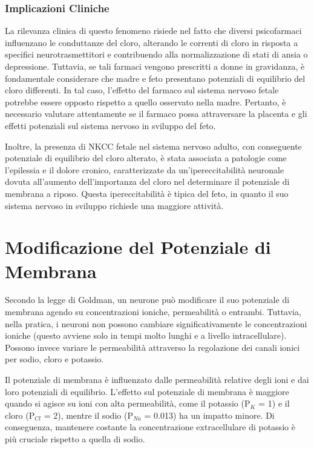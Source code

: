 \subsubsection{Implicazioni Cliniche}

La rilevanza clinica di questo fenomeno risiede nel fatto che diversi psicofarmaci influenzano le conduttanze del cloro, alterando le correnti di cloro in risposta a specifici neurotrasmettitori e contribuendo alla normalizzazione di stati di ansia o depressione. Tuttavia, se tali farmaci vengono prescritti a donne in gravidanza, è fondamentale considerare che madre e feto presentano potenziali di equilibrio del cloro differenti. In tal caso, l’effetto del farmaco sul sistema nervoso fetale potrebbe essere opposto rispetto a quello osservato nella madre. Pertanto, è necessario valutare attentamente se il farmaco possa attraversare la placenta e gli effetti potenziali sul sistema nervoso in sviluppo del feto.

Inoltre, la presenza di NKCC fetale nel sistema nervoso adulto, con conseguente potenziale di equilibrio del cloro alterato, è stata associata a patologie come l’epilessia e il dolore cronico, caratterizzate da un’ipereccitabilità neuronale dovuta all’aumento dell’importanza del cloro nel determinare il potenziale di membrana a riposo. Questa ipereccitabilità è tipica del feto, in quanto il suo sistema nervoso in sviluppo richiede una maggiore attività.

\section{Modificazione del Potenziale di Membrana}
Secondo la legge di Goldman, un neurone può modificare il suo potenziale di membrana agendo su concentrazioni ioniche, permeabilità o entrambi. Tuttavia, nella pratica, i neuroni non possono cambiare significativamente le concentrazioni ioniche (questo avviene solo in tempi molto lunghi e a livello intracellulare). Possono invece variare le permeabilità attraverso la regolazione dei canali ionici per sodio, cloro e potassio.

Il potenziale di membrana è influenzato dalle permeabilità relative degli ioni e dai loro potenziali di equilibrio. L'effetto sul potenziale di membrana è maggiore quando si agisce su ioni con alta permeabilità, come il potassio (P$_{K}$ = 1) e il cloro (P$_{Cl}$ = 2), mentre il sodio (P$_{Na}$ = 0.013) ha un impatto minore. Di conseguenza, mantenere costante la concentrazione extracellulare di potassio è più cruciale rispetto a quella di sodio.

